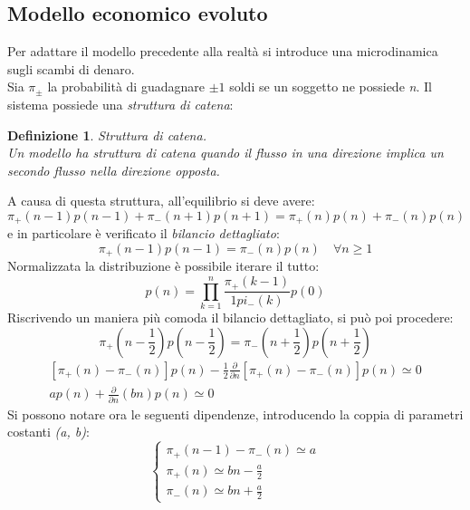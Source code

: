 \documentclass[12pt, a4paper]{book}
\theoremstyle{theorem}
\newtheorem{definition}{Definizione}[section]
\begin{document}
			\subsection{Modello economico evoluto}
				Per adattare il modello precedente alla realtà si introduce una microdinamica sugli scambi di denaro.\\
				Sia $\pi_\pm$ la probabilità di guadagnare $\pm 1$ soldi se un soggetto ne possiede \textit{n}. Il sistema possiede una \textit{struttura di catena}:
				\begin{definition}
					Struttura di catena.\\
					Un modello ha struttura di catena quando il flusso in una direzione implica un secondo flusso nella direzione opposta.
				\end{definition}
				A causa di questa struttura, all'equilibrio si deve avere:
				\begin{equation*}
					\pi_+(n-1)p(n-1)+\pi_-(n+1)p(n+1)=\pi_+(n)p(n)+\pi_-(n)p(n)
				\end{equation*}
				e in particolare è verificato il \textit{bilancio dettagliato}:
				\begin{equation}
					\pi_+(n-1)p(n-1)=\pi_-(n)p(n)\quad \forall n\geq 1
				\end{equation}
				Normalizzata la distribuzione è possibile iterare il tutto:
				\begin{equation*}
					p(n)=\prod_{k=1}^n\frac{\pi_+(k-1)}{1pi_-(k)}p(0)
				\end{equation*}
				Riscrivendo un maniera più comoda il bilancio dettagliato, si può poi procedere:
				\begin{equation*}
					\pi_+(n-\frac{1}{2})p(n-\frac{1}{2})=\pi_-(n+\frac{1}{2})p(n+\frac{1}{2})
				\end{equation*}
				\begin{equation*}
					\begin{split}
						[\pi_+(n)-\pi_-(n)]p(n)-\frac{1}{2}\frac{\partial}{\partial n}[\pi_+(n)-\pi_-(n)]p(n)\simeq 0\\
						ap(n)+\frac{\partial}{\partial n}(bn)p(n)\simeq 0
					\end{split}
				\end{equation*}
				Si possono notare ora le seguenti dipendenze, introducendo la coppia di parametri costanti \textit{(a, b)}:
				\begin{equation*}
					\begin{cases}
						\pi_+(n-1)-\pi_-(n)\simeq a\\
						\pi_+(n)\simeq bn-\frac{a}{2}\\
						\pi_-(n)\simeq bn+\frac{a}{2}
					\end{cases}
				\end{equation*}
\end{document}
